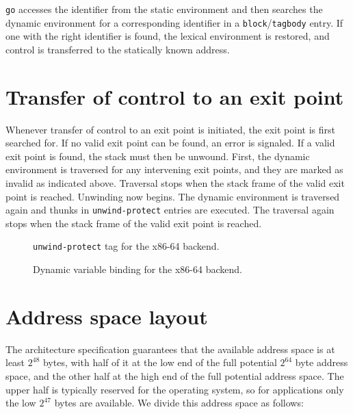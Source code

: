 \texttt{go} accesses the identifier from the static environment and
then searches the dynamic environment for a corresponding identifier
in a \texttt{block}/\texttt{tagbody} entry.  If one with the right
identifier is found, the lexical environment is restored, and control
is transferred to the statically known address.

\section{Transfer of control to an exit point}

Whenever transfer of control to an exit point is initiated, the exit
point is first searched for.  If no valid exit point can be found, an
error is signaled.  If a valid exit point is found, the stack must
then be unwound.  First, the dynamic environment is traversed for any
intervening exit points, and they are marked as invalid as indicated
above.  Traversal stops when the stack frame of the valid exit point
is reached.  Unwinding now begins.  The dynamic environment is
traversed again and thunks in \texttt{unwind-protect} entries are
executed.  The traversal again stops when the stack frame of the valid
exit point is reached.

\begin{figure}
\begin{center}
\end{center}
\caption{\label{fig-x86-64-unwind-protect}
\texttt{unwind-protect} tag for the x86-64 backend.}
\end{figure}

\begin{figure}
\begin{center}
\end{center}
\caption{\label{fig-x86-64-dynamic-binding}
Dynamic variable binding for the x86-64 backend.}
\end{figure}

\section{Address space layout}

The architecture specification guarantees that the available address
space is at least $2^{48}$ bytes, with half of it at the low end of
the full potential $2^{64}$ byte address space, and the other half at
the high end of the full potential address space.  The upper half is
typically reserved for the operating system, so for applications only
the low $2^{47}$ bytes are available.  We divide this address space as
follows:

